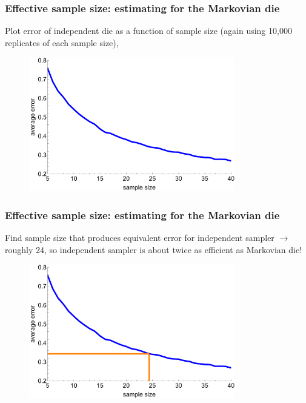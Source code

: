 \documentclass[handout]{beamer}
\begin{document}
\begin{frame}
	\frametitle{Effective sample size:  estimating for the Markovian die}
	 Plot error of independent die as a function of sample size (again using 10,000 replicates of each sample size),
	\onslide<3->
	\begin{figure}[ht]
		\centerline{\includegraphics[width=0.8\textwidth]{./Figures/lec6_MarkovianDie_independentSampleSize1.pdf}}
	\end{figure}
	
\end{frame}

\begin{frame}
	\frametitle{Effective sample size:  estimating for the Markovian die}
	 Find sample size that produces equivalent error for independent sampler \onslide<2-> $\rightarrow$ roughly 24, so independent sampler is about twice as efficient as Markovian die!
	\onslide<1->
	\begin{figure}[ht]
		\centerline{\includegraphics[width=0.8\textwidth]{./Figures/lec6_MarkovianDie_independentSampleSize2.pdf}}
	\end{figure}
	
\end{frame}
\end{document}
